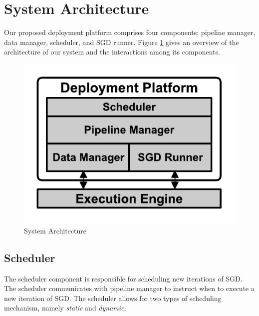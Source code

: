 \section{System Architecture} \label{sec:system-architecture}
Our proposed deployment platform comprises four components; pipeline manager, data manager, scheduler, and SGD runner.
Figure \ref{fig:system-architecture} gives an overview of the architecture of our system and the interactions among its components.

\begin{figure}[t]
\centering
\includegraphics[width=\columnwidth]{../images/system-architecture.pdf}
\caption{System Architecture}
\label{fig:system-architecture}
\end{figure}

\subsection{Scheduler}\label{scheduler}
The scheduler component is responsible for scheduling new iterations of SGD.
The scheduler communicates with pipeline manager to instruct when to execute a new iteration of SGD.
The scheduler allows for two types of scheduling mechanism, namely \textit{static} and \textit{dynamic}.

